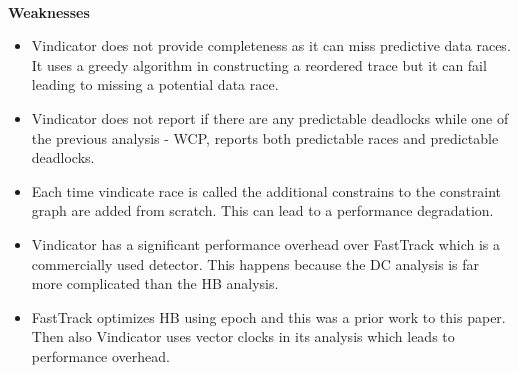 \documentclass[20pt]{letter}
\begin{document}
\begin{enumerate}
{\textbf{\\Weaknesses}\\
\begin{itemize}
    \item Vindicator does not provide completeness as it can miss predictive data races. It uses a greedy algorithm in constructing a reordered trace but it can fail leading to missing a potential data race.
    \item Vindicator does not report if there are any predictable deadlocks while one of the previous analysis - WCP, reports both predictable races and predictable deadlocks.
    \item Each time vindicate race is called the additional constrains to the constraint graph are added from scratch. This can lead to a performance degradation. 
    \item Vindicator has a significant performance overhead over FastTrack which is a commercially used detector. This happens because the DC analysis is far more complicated than the HB analysis.
    \item FastTrack optimizes HB using epoch and this was a prior work to this paper. Then also Vindicator uses vector clocks in its analysis which leads to performance overhead.
\end{itemize}

}
\end{enumerate}
\end{document}

